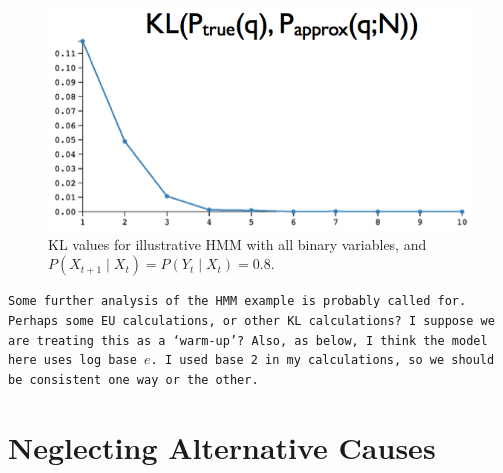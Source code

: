 \documentclass[10pt,letterpaper]{article}
\begin{document}
\begin{center} \begin{figure}[h]
\includegraphics[scale=0.42]{hmm.png} \caption{KL values for illustrative HMM with all binary variables, and $P(X_{t+1}\mid X_t) = P(Y_t\mid X_t) = 0.8$.} \label{hmm}
\end{figure} 
\end{center}
\texttt{Some further analysis of the HMM example is probably called for. Perhaps some EU calculations, or other KL calculations? I suppose we are treating this as a `warm-up'? Also, as below, I think the model here uses log base $e$. I used base 2 in my calculations, so we should be consistent one way or the other.}

\section{Neglecting Alternative Causes}
\end{document}
